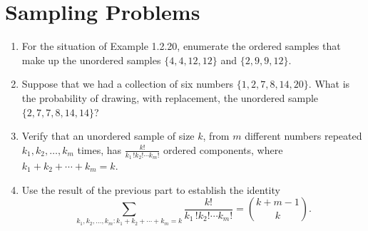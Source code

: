 \section{Sampling Problems}

\begin{problembox}
\begin{enumerate}[label=(\alph*)]
    \item For the situation of Example 1.2.20, enumerate the ordered samples that make up the unordered samples $\{4,4,12,12\}$ and $\{2,9,9,12\}$.
    \item Suppose that we had a collection of six numbers $\{1,2,7,8,14,20\}$. What is the probability of drawing, with replacement, the unordered sample $\{2,7,7,8,14,14\}$?
    \item Verify that an unordered sample of size $k$, from $m$ different numbers repeated $k_{1},k_{2},\ldots,k_{m}$ times, has $\frac{k!}{k_{1}\,!k_{2}!\cdots k_{m}!}$ ordered components, where $k_{1}+k_{2}+\cdots+k_{m}=k$.
    \item Use the result of the previous part to establish the identity
    \[ \sum_{k_{1},k_{2},\ldots,k_{m}:k_{1}+k_{2}+\cdots+k_{m}=k}\frac{k!}{k_{1}\,!k_{2}!\cdots k_{m}!}=\binom{k+m-1}{k}. \]
\end{enumerate}
\end{problembox}

